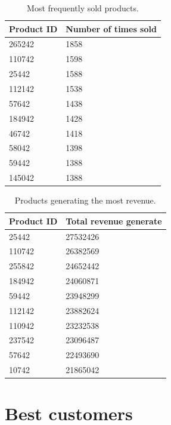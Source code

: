 \documentclass{article}
\begin{document}
\begin{table}[h]
  \medskip
  \centering
  \begin{tabular}{l l}
    \toprule
    Product ID & Number of times sold    \\
    \midrule
    
    265242   & 1858 \\
    110742   & 1598 \\
    25442    & 1588 \\
    112142   & 1538 \\
    57642    & 1438 \\
    184942   & 1428 \\
    46742    & 1418 \\
    58042    & 1398 \\
    59442    & 1388 \\
    145042   & 1388 \\
    
    \bottomrule
  \end{tabular}
  \medskip
  \caption{Most frequently sold products.}
  \label{tab:frequency}
\end{table}


\begin{table}[h]
  \medskip
  \centering
  \begin{tabular}{l l}
    \toprule
    Product ID & Total revenue generate    \\
    \midrule
 
    25442     & 27532426\\
    110742    & 26382569\\
    255842    & 24652442\\
    184942    & 24060871\\
    59442     & 23948299\\
    112142    & 23882624\\
    110942    & 23232538\\
    237542    & 23096487\\
    57642     & 22493690\\
    10742     & 21865042\\

    \bottomrule
  \end{tabular}
  \medskip
  \caption{Products generating the most revenue.}
  \label{tab:revenue}
\end{table}


\section{Best customers}
\end{document}
